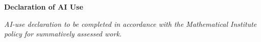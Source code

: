 \begin{alwayssingle}
\thispagestyle{empty}
\begin{center}
\vspace*{1.5cm}
{\Large\bfseries Declaration of AI Use}
\end{center}
\vspace{0.5cm}

\noindent\textit{AI-use declaration to be completed in accordance with the Mathematical Institute policy for summatively assessed work.}
\end{alwayssingle}
